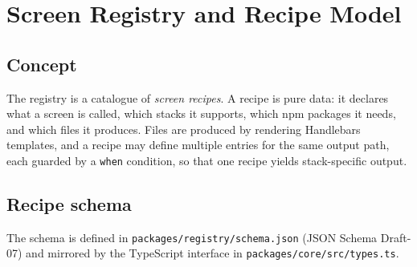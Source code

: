 \chapter{Screen Registry and Recipe Model}
\label{ch:registry-and-recipes}

\section{Concept}

The registry is a catalogue of \emph{screen recipes}. A recipe is pure data: it
declares what a screen is called, which stacks it supports, which npm packages it
needs, and which files it produces. Files are produced by rendering Handlebars
templates, and a recipe may define multiple entries for the same output path, each
guarded by a \texttt{when} condition, so that one recipe yields stack-specific
output.

\section{Recipe schema}

The schema is defined in \texttt{packages/registry/schema.json} (JSON Schema
Draft-07) and mirrored by the TypeScript interface in
\texttt{packages/core/src/types.ts}.

